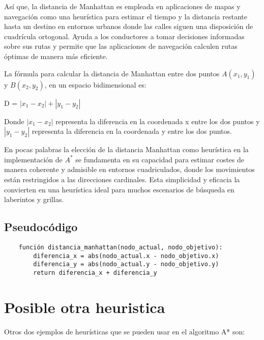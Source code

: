 Así que, la distancia de Manhattan es empleada en aplicaciones de mapas y navegación como una heurística para estimar el tiempo y la distancia restante hasta un destino en entornos urbanos donde las calles siguen una disposición de cuadrícula ortogonal. Ayuda a los conductores a tomar decisiones informadas sobre sus rutas y permite que las aplicaciones de navegación calculen rutas óptimas de manera más eficiente.


La fórmula para calcular la distancia de Manhattan entre dos puntos $A(x_1, y_1)$ y $B(x_2,y_2)$, en un espacio bidimensional es:
\begin{center}
    D = $|x_1 - x_2| + |y_1 - y_2|$
\end{center}

Donde $|x_1 - x_2|$ representa la diferencia en la coordenada x entre los dos puntos y  $|y_1 - y_2|$ representa la diferencia en la coordenada 
y entre los dos puntos.

En pocas palabras la elección de la distancia Manhattan como heurística en la implementación de $A^{*}$ se fundamenta en su capacidad para estimar costes de manera coherente y admisible en entornos cuadriculados, donde los movimientos están restringidos a las direcciones cardinales. Esta simplicidad y eficacia la convierten en una heurística ideal para muchos escenarios de búsqueda en laberintos y grillas.
\subsection*{Pseudocódigo}

\begin{verbatim}
    función distancia_manhattan(nodo_actual, nodo_objetivo):
        diferencia_x = abs(nodo_actual.x - nodo_objetivo.x)
        diferencia_y = abs(nodo_actual.y - nodo_objetivo.y)
        return diferencia_x + diferencia_y
    \end{verbatim}
\section{Posible otra heuristica}
Otros dos ejemplos de heurísticas que se pueden usar en el algoritmo A* son:

